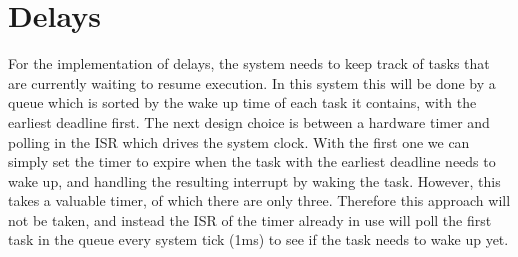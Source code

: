 \section{Delays}
For the implementation of delays, the system needs to
keep track of tasks that are currently waiting to resume execution. In
this system this will be done by a queue which is sorted by the wake up
time of each task it contains, with the earliest deadline first. The
next design choice is between a hardware timer and polling in the ISR
which drives the system clock. With the first one we can simply set the
timer to expire when the task with the earliest deadline needs to wake
up, and handling the resulting interrupt by waking the task. However,
this takes a valuable timer, of which there are only three. Therefore
this approach will not be taken, and instead the ISR of the timer
already in use will poll the first task in the queue every system tick
(1ms) to see if the task needs to wake up yet.


